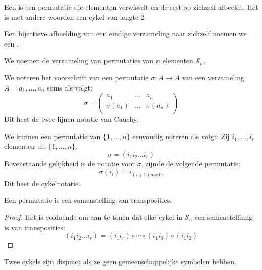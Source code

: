 \documentclass[main.tex]{subfiles}
\begin{document}
\begin{de}
  Een  is een permutatie die elementen verwisselt en de rest op zichzelf afbeeldt.
  Het is met andere woorden een cykel van lengte 2.
\end{de}

\begin{de}
  Een bijectieve afbeelding van een eindige verzameling naar zichzelf noemen we een .
\end{de}

\begin{de}
  We noemen de verzameling van permutaties van $n$ elementen $\mathcal{S}_{n}$.
\end{de}

\begin{de}
  We noteren het voorschrift van een permutatie $\sigma: A\rightarrow A$ van een verzameling $A = a_{1},\dotsc,a_{n}$ soms als volgt:
  \[
  \sigma = 
  \begin{pmatrix}
    a_{1}         & \hdots & a_{n}         \\
    \sigma(a_{1}) & \hdots & \sigma(a_{n}) \\
  \end{pmatrix}
  \]
  Dit heet de twee-lijnen notatie van Cauchy.
\end{de}

\begin{de}
  We kunnen een permutatie van $\{1,\dotsc,n\}$ eenvoudig noteren als volgt:
  Zij $i_{1},\dotsc,i_{r}$ elementen uit $\{1,\dotsc,n\}$.
  \[ \sigma = (i_{1}i_{2}\dotsc i_{r}) \]
  Bovenstaande gelijkheid is de notatie voor $\sigma$, zijnde de volgende permutatie:
  \[ \sigma(i_{i}) = i_{(i+1) mod\ r} \]
  Dit heet de cykelnotatie.
\end{de}

\begin{st}
  Een permutatie is een samenstelling van transposities.

  \begin{proof}
    Het is voldoende om aan te tonen dat elke cykel in $\mathcal{S}_{n}$ een samenstellinng is van transposities:
    \[ (i_{1}i_{2}\dotsc i_{r}) = (i_{1}i_{r}) \circ \dotsb \circ (i_{1}i_{3}) \circ (i_{1}i_{2})\]
  \end{proof}
\end{st}

\begin{de}
  Twee cykels zijn disjunct als ze geen gemeenschappelijke symbolen hebben. 
\end{de}
\end{document}
